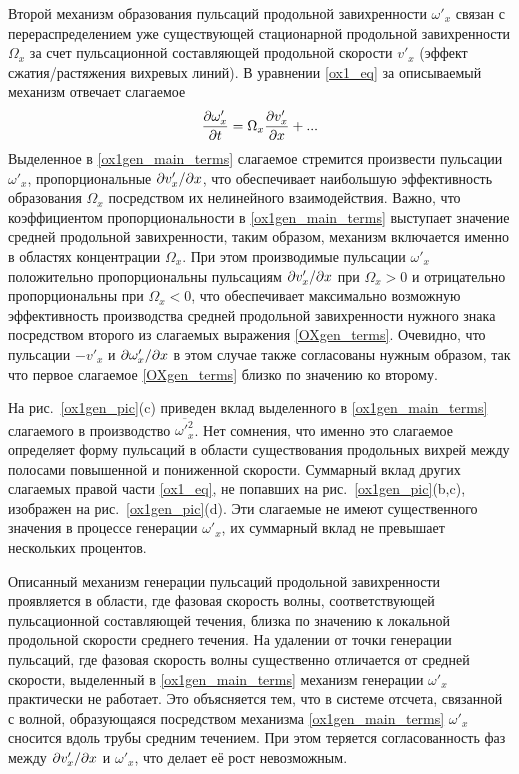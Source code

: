 Второй механизм образования пульсаций продольной завихренности $\omega'_x$ связан с перераспределением уже существующей стационарной продольной завихренности $\Omega_x$ за счет пульсационной составляющей продольной скорости $v'_x$ (эффект сжатия/растяжения вихревых линий). В уравнении \eqref{ox1_eq} за описываемый механизм отвечает слагаемое
\begin{equation}\label{ox1gen_main_terms}
\frac{\partial \omega'_x}{\partial t} = \Omega_x \frac {\partial v'_x}{\partial x} + ...
\end{equation}
Выделенное в \eqref{ox1gen_main_terms} слагаемое стремится произвести пульсации $\omega'_x$, пропорциональные $\partial v'_x / \partial x$, что обеспечивает наибольшую эффективность образования $\Omega_x$ посредством их нелинейного взаимодействия. Важно, что коэффициентом пропорциональности в \eqref{ox1gen_main_terms} выступает значение средней продольной завихренности, таким образом, механизм включается именно в областях концентрации $\Omega_x$. При этом производимые пульсации $\omega'_x$ положительно пропорциональны пульсациям  $\partial v'_x / \partial x$ при $\Omega_x>0$ и отрицательно пропорциональны при $\Omega_x<0$, что обеспечивает максимально возможную эффективность производства средней продольной завихренности нужного знака посредством второго из слагаемых выражения \eqref{OXgen_terms}. Очевидно, что пульсации $-v'_x$ и $\partial \omega'_x / \partial x$ в этом случае также согласованы нужным образом, так что первое слагаемое \eqref{OXgen_terms} близко по значению ко второму.


На рис.~\ref{ox1gen_pic}(c) приведен вклад выделенного в \eqref{ox1gen_main_terms} слагаемого в производство $\overline{\omega'^2_x}$. Нет сомнения, что именно это слагаемое определяет форму пульсаций в области существования продольных вихрей между полосами повышенной и пониженной скорости. Суммарный вклад других слагаемых правой части \eqref{ox1_eq}, не попавших на рис.~\ref{ox1gen_pic}(b,c), изображен на рис.~\ref{ox1gen_pic}(d). Эти слагаемые не имеют существенного значения в процессе генерации $\omega'_x$, их суммарный вклад не превышает нескольких процентов.

Описанный механизм генерации пульсаций продольной завихренности проявляется в области, где фазовая скорость волны, соответствующей пульсационной составляющей течения, близка по значению к локальной продольной скорости среднего течения. На удалении от точки генерации пульсаций, где фазовая скорость волны существенно отличается от средней скорости, выделенный в \eqref{ox1gen_main_terms} механизм генерации $\omega'_x$ практически не работает. Это объясняется тем, что в системе отсчета, связанной с волной, образующаяся посредством механизма \eqref{ox1gen_main_terms} $\omega'_x$ сносится вдоль трубы средним течением. При этом теряется согласованность фаз между $\partial v'_x / \partial x$ и $\omega'_x$, что делает её рост невозможным.


